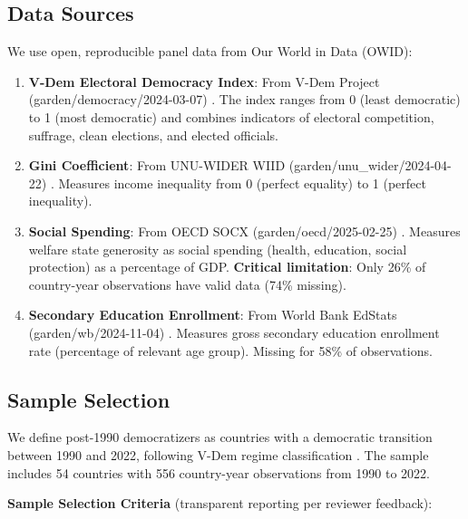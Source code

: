 \documentclass[11pt,letterpaper]{article}
\begin{document}
\subsection{Data Sources}

We use open, reproducible panel data from Our World in Data (OWID):

\begin{enumerate}
  \item \textbf{V-Dem Electoral Democracy Index}: From V-Dem Project (garden/democracy/2024-03-07) \cite{Coppedge2024}. The index ranges from 0 (least democratic) to 1 (most democratic) and combines indicators of electoral competition, suffrage, clean elections, and elected officials.

  \item \textbf{Gini Coefficient}: From UNU-WIDER WIID (garden/unu\_wider/2024-04-22) \cite{UNUWIDER2024}. Measures income inequality from 0 (perfect equality) to 1 (perfect inequality).

  \item \textbf{Social Spending}: From OECD SOCX (garden/oecd/2025-02-25) \cite{OECD2025}. Measures welfare state generosity as social spending (health, education, social protection) as a percentage of GDP. \textbf{Critical limitation}: Only 26\% of country-year observations have valid data (74\% missing).

  \item \textbf{Secondary Education Enrollment}: From World Bank EdStats (garden/wb/2024-11-04) \cite{WorldBank2024}. Measures gross secondary education enrollment rate (percentage of relevant age group). Missing for 58\% of observations.
\end{enumerate}

\subsection{Sample Selection}

We define post-1990 democratizers as countries with a democratic transition between 1990 and 2022, following V-Dem regime classification \cite{Coppedge2024}. The sample includes 54 countries with 556 country-year observations from 1990 to 2022.

\textbf{Sample Selection Criteria} (transparent reporting per reviewer feedback):
\end{document}
